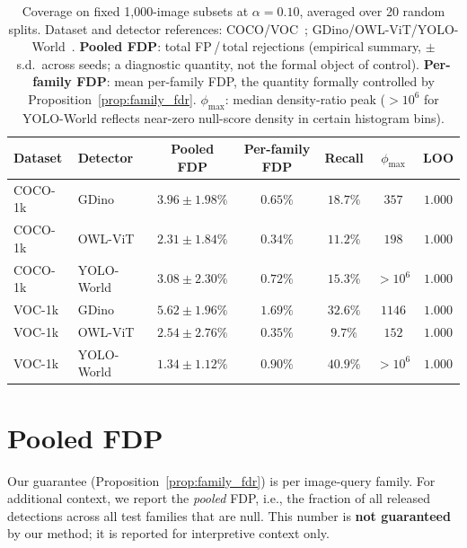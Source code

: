 \documentclass{article}
\theoremstyle{remark}
\newcommand{\1}{\mathbf{1}}
\begin{document}
\begin{table}[h]
\centering
\small
\begin{tabular*}{\linewidth}{@{\extracolsep{\fill}}llccccc@{}}
\toprule
Dataset & Detector & Pooled FDP & Per-family FDP & Recall & $\phi_{\max}$ & LOO \\
\midrule
COCO-1k & GDino & $3.96 \pm 1.98\%$ & $0.65\%$ & $18.7\%$ & $357$ & $1.000$ \\
COCO-1k & OWL-ViT & $2.31 \pm 1.84\%$ & $0.34\%$ & $11.2\%$ & $198$ & $1.000$ \\
COCO-1k & YOLO-World & $3.08 \pm 2.30\%$ & $0.72\%$ & $15.3\%$ & ${\scriptstyle >}10^{6}$ & $1.000$ \\
\midrule
VOC-1k & GDino & $5.62 \pm 1.96\%$ & $1.69\%$ & $32.6\%$ & $1146$ & $1.000$ \\
VOC-1k & OWL-ViT & $2.54 \pm 2.76\%$ & $0.35\%$ & $9.7\%$ & $152$ & $1.000$ \\
VOC-1k & YOLO-World & $1.34 \pm 1.12\%$ & $0.90\%$ & $40.9\%$ & ${\scriptstyle >}10^{6}$ & $1.000$ \\
\bottomrule
\end{tabular*}
\caption{Coverage on fixed 1{,}000-image subsets at $\alpha=0.10$, averaged over
20 random splits. Dataset and detector references:
COCO/VOC~\cite{lin2014microsoft,everingham2010pascal};
GDino/OWL-ViT/YOLO-World~\cite{liu2024grounding,minderer2022simple,cheng2024yolo}.
\textbf{Pooled FDP}: total FP\,/\,total rejections (empirical summary,
$\pm$ s.d.\ across seeds; a diagnostic quantity, not the formal object
of control).
\textbf{Per-family FDP}: mean per-family FDP, the quantity formally
controlled by Proposition~\ref{prop:family_fdr}.
$\phi_{\max}$: median density-ratio peak ($>10^{6}$ for YOLO-World
reflects near-zero null-score density in certain histogram bins).}
\label{tab:coverage_1k}
\end{table}

\section{Pooled FDP}
\label{app:pooled_fdp}

Our guarantee (Proposition~\ref{prop:family_fdr}) is per image-query family.
For additional context, we report the \emph{pooled} FDP, i.e., the fraction
of all released detections across all test families that are null. This number
is \textbf{not guaranteed} by our method; it is reported for interpretive
context only.
\end{document}
